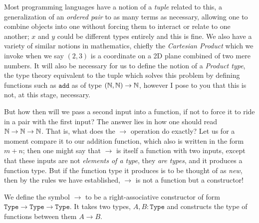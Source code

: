 \documentclass[11pt]{article}
\begin{document}
Most programming languages have a notion of a \emph{tuple} related to this, a generalization of an \emph{ordered pair} to as many terms as necessary, allowing one to combine objects into one without forcing them to interact or relate to one another; $x$ and $y$ could be different types entirely and this is fine. We also have a variety of similar notions in mathematics, chiefly the \emph{Cartesian Product} which we invoke when we say $(2,3)$ is a coordinate on a 2D plane combined of two mere numbers. It will also be necessary for us to define the notion of a \emph{Product type}, the type theory equivalent to the tuple which solves this problem by defining functions such as $\mathtt{add}$ as of type $(\mathbb{N},\mathbb{N}) \to \mathbb{N}$, however I pose to you that this is not, at this stage, necessary.

But how then will we pass a second input into a function, if not to force it to ride in a pair with the first input? The answer lies in how one should read $\mathbb{N} \to \mathbb{N} \to \mathbb{N}$. That is, what does the $\to$ operation do exactly? Let us for a moment compare it to our addition function, which also is written in the form $m + n$; then one might say that $\to$ is itself a function with two inputs, except that these inputs are not \emph{elements of a type}, they \emph{are types}, and it produces a function type. But if the function type it produces is to be thought of as \emph{new}, then by the rules we have established, $\to$ is not a function but a constructor!

\begin{definition}
We define the symbol $\to$ to be a right-associative constructor of form $\mathtt{Type} \to \mathtt{Type} \to \mathtt{Type}$. It takes two types, $A, B \colon \mathtt{Type}$ and constructs the type of functions between them $A \to B$.
\end{definition}
\end{document}
